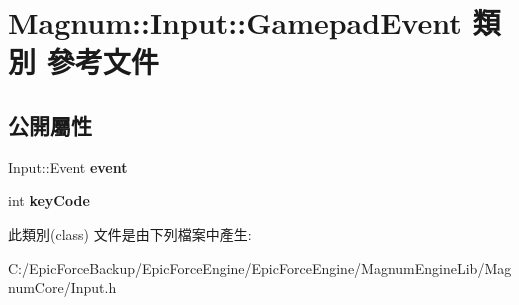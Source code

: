 \hypertarget{class_magnum_1_1_input_1_1_gamepad_event}{}\section{Magnum\+:\+:Input\+:\+:Gamepad\+Event 類別 參考文件}
\label{class_magnum_1_1_input_1_1_gamepad_event}
\subsection*{公開屬性}
\begin{DoxyCompactItemize}
\item 
Input\+::\+Event {\bfseries event}\hypertarget{class_magnum_1_1_input_1_1_gamepad_event_aa94ecb81fc8d43d20448ffb0672b27ec}{}\label{class_magnum_1_1_input_1_1_gamepad_event_aa94ecb81fc8d43d20448ffb0672b27ec}

\item 
int {\bfseries key\+Code}\hypertarget{class_magnum_1_1_input_1_1_gamepad_event_a7e969ecddaf5345af3d2b87882253811}{}\label{class_magnum_1_1_input_1_1_gamepad_event_a7e969ecddaf5345af3d2b87882253811}

\end{DoxyCompactItemize}


此類別(class) 文件是由下列檔案中產生\+:\begin{DoxyCompactItemize}
\item 
C\+:/\+Epic\+Force\+Backup/\+Epic\+Force\+Engine/\+Epic\+Force\+Engine/\+Magnum\+Engine\+Lib/\+Magnum\+Core/Input.\+h\end{DoxyCompactItemize}
